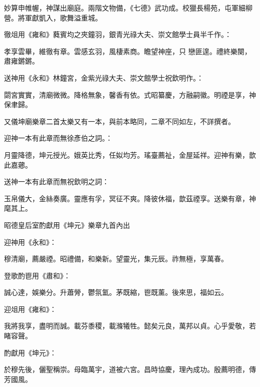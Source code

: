 \begin{pinyinscope}
 妙算申帷幄，神謀出廟庭。兩階文物備，《七德》武功成。校獵長楊苑，屯軍細柳營。將軍獻凱入，歌舞溢重城。



 徹俎用《雍和》蕤賓均之夾鐘羽，銀青光祿大夫、崇文館學士員半千作。：



 孝享雲畢，維徹有章。雲感玄羽，風棲素商。瞻望神座，只
 戀匪遑。禮終樂闋，肅雍鏘鏘。



 送神用《永和》林鐘宮，金紫光祿大夫、崇文館學士祝欽明作。：



 閟宮實實，清廟微微。降格無象，馨香有依。式昭纂慶，方融嗣徽。明禋是享，神保聿歸。



 又儀坤廟樂章二首太樂又有一本，與前本略同，二章不同如左，不詳撰者。



 迎神一本有此章而無徐彥伯之詞。：



 月靈降德，坤元授光。娥英比秀，任姒均芳。瑤臺薦祉，金屋延祥。迎神有樂，歆此嘉薌。



 送神一本有此章而無祝欽明之詞：



 玉帛儀大，金絲奏廣。靈應有孚，冥征不爽。降彼休福，歆茲禋享。送樂有章，神麾其上。



 昭德皇后室酌獻用《坤元》樂章九首內出



 迎神用《永和》：



 穆清廟，薦嚴禋。昭禮備，和樂新。望靈光，集元辰。祚無極，享萬春。



 登歌酌鬯用《肅和》：



 誠心達，娛樂分。升蕭膋，鬱氛氳。茅既縮，鬯既薰。後來思，福如云。



 迎俎用《雍和》：



 我將我享，盡明而誠。載芬黍稷，載滌犧牲。懿矣元良，萬邦以貞。心乎愛敬，若睹容聲。



 酌獻用《坤元》：



 於穆先後，儷聖稱崇。母臨萬宇，道被六宮。昌時協慶，理內成功。殷薦明德，傳芳國風。




\end{pinyinscope}
